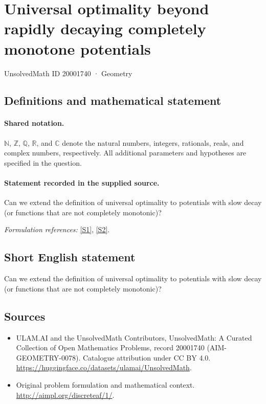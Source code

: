\documentclass[11pt]{article}
\newcommand{\sref}[2]{\hyperlink{source:#1:#2}{[S#2]}}
\begin{document}
\setcounter{section}{20001739}
\section{Universal optimality beyond rapidly decaying completely monotone potentials}\label{20001740}
{\small UnsolvedMath ID 20001740 · Geometry}
\subsection{Definitions and mathematical statement}

\paragraph{Shared notation.}$\mathbb N$, $\mathbb Z$, $\mathbb Q$, $\mathbb R$, and $\mathbb C$ denote the natural numbers, integers, rationals, reals, and complex numbers, respectively. All additional parameters and hypotheses are specified in the question.


\paragraph{Statement recorded in the supplied source.}
Can we extend the definition of universal optimality to potentials with slow decay (or functions that are not completely monotonic)?
\par\smallskip\textit{Formulation references:} \sref{20001740}{1}, \sref{20001740}{2}.
\subsection{Short English statement}
Can we extend the definition of universal optimality to potentials with slow decay (or functions that are not completely monotonic)?
\subsection{Sources}
\begin{itemize}
\item[\hypertarget{source:20001740:1}{S1}] ULAM.AI and the UnsolvedMath Contributors, UnsolvedMath: A Curated Collection of Open Mathematics Problems, record 20001740 (AIM-GEOMETRY-0078). Catalogue attribution under CC BY 4.0.
\url{https://huggingface.co/datasets/ulamai/UnsolvedMath}.
\item[\hypertarget{source:20001740:2}{S2}] Original problem formulation and mathematical context.
\url{http://aimpl.org/discreteaf/1/}.
\end{itemize}
\label{end:20001740}
\end{document}
